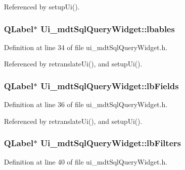 Referenced by setup\-Ui().

\hypertarget{class_ui__mdt_sql_query_widget_a69530ce753db3cab9d7ab82f563f866d}{
\subsubsection[{lbables}]{\setlength{\rightskip}{0pt plus 5cm}Q\-Label$\ast$ Ui\-\_\-mdt\-Sql\-Query\-Widget\-::lbables}}\label{class_ui__mdt_sql_query_widget_a69530ce753db3cab9d7ab82f563f866d}


Definition at line 34 of file ui\-\_\-mdt\-Sql\-Query\-Widget.\-h.



Referenced by retranslate\-Ui(), and setup\-Ui().

\hypertarget{class_ui__mdt_sql_query_widget_a19e07473864132421f40bdae895d3cd0}{
\subsubsection[{lb\-Fields}]{\setlength{\rightskip}{0pt plus 5cm}Q\-Label$\ast$ Ui\-\_\-mdt\-Sql\-Query\-Widget\-::lb\-Fields}}\label{class_ui__mdt_sql_query_widget_a19e07473864132421f40bdae895d3cd0}


Definition at line 36 of file ui\-\_\-mdt\-Sql\-Query\-Widget.\-h.



Referenced by retranslate\-Ui(), and setup\-Ui().

\hypertarget{class_ui__mdt_sql_query_widget_a4c009901e7d5ee9b94f30c42288342db}{
\subsubsection[{lb\-Filters}]{\setlength{\rightskip}{0pt plus 5cm}Q\-Label$\ast$ Ui\-\_\-mdt\-Sql\-Query\-Widget\-::lb\-Filters}}\label{class_ui__mdt_sql_query_widget_a4c009901e7d5ee9b94f30c42288342db}


Definition at line 40 of file ui\-\_\-mdt\-Sql\-Query\-Widget.\-h.



